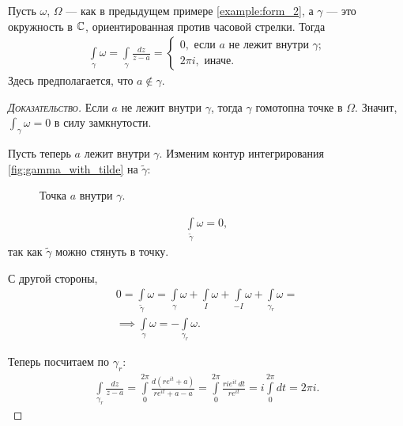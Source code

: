 \documentclass[../complex-analysis.tex]{subfiles}
\begin{document}
\begin{exmpl}
	\label{example:form_dz_div_z_minus_a}
 Пусть $\omega$, $\Omega$ --- как в предыдущем примере \ref{example:form_2}, а $\gamma$ --- это окружность в $\mathbb{C}$, ориентированная против часовой стрелки. Тогда
 \begin{align*}
  \int\limits_{\gamma} \omega = \int\limits_{\gamma} \frac{dz}{z-a} = \begin{cases}
   0, \text{ если $a$ не лежит внутри $\gamma$;}  \\
   2\pi i, \text{ иначе. }
  \end{cases} 
 \end{align*} Здесь предполагается, что $a \notin \gamma$.
\end{exmpl}
\begin{proof}[\normalfont\textsc{Доказательство}]
 Если $a$ не лежит внутри $\gamma$, тогда $\gamma$ гомотопна точке в $\Omega$. Значит, $\int_{\gamma} \omega = 0 $  в силу замкнутости.

Пусть теперь $a$  лежит внутри $\gamma$. Изменим контур интегрирования \eqref{fig:gamma_with_tilde} на $\tilde\gamma$:

\begin{figure}[ht]
    \centering
    \caption{Точка $a$ внутри $\gamma$. }
    \label{fig:gamma_with_tilde}
\end{figure}

\begin{align*}
 \int\limits_{\tilde\gamma}  \omega = 0,
\end{align*} так как $\tilde\gamma$ можно стянуть в точку.

С другой стороны,
 \begin{align*}
 0 = \int\limits_{\tilde\gamma}  \omega = \int\limits_{\gamma}  \omega + \int\limits_{I}  \omega + \int\limits_{-I}   \omega + \int\limits_{\gamma_r}  \omega = \\
 \implies \int\limits_{\gamma} \omega = -\int\limits_{\gamma_r}   \omega.
\end{align*}

Теперь посчитаем по $\gamma_r$:
 \begin{align*}
 \int\limits_{\gamma_r} \frac{dz}{z - a}  = \int\limits_{0}^{2\pi}   \frac{d(re^{it} + a)}{r e^{it} + a - a} = \int\limits_{0}^{2\pi}  \frac{r i e^{it}\,dt}{r e^{it}} = i \int\limits_{0}^{2\pi} dt = 2\pi i.
\end{align*} 

\end{proof}
\end{document}
